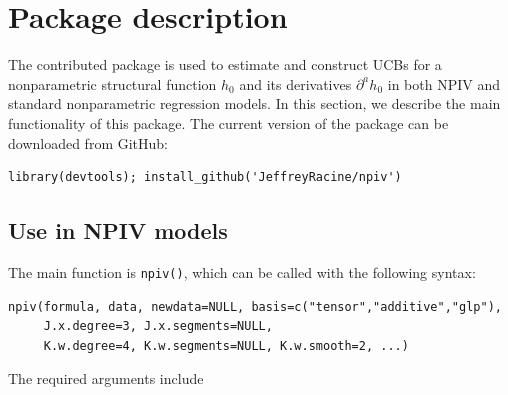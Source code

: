 \documentclass[
]{jss}
\begin{document}
\hypertarget{desc}{%
\section{Package description}\label{desc}}

The contributed  package  is used to estimate and
construct UCBs for a nonparametric structural function \(h_0\) and its
derivatives \(\partial^a h_0\) in both NPIV and standard nonparametric
regression models. In this section, we describe the main functionality
of this package. The current version of the package can be downloaded
from GitHub:

\begin{verbatim}
library(devtools); install_github('JeffreyRacine/npiv')
\end{verbatim}

\hypertarget{use-in-npiv-models}{%
\subsection{Use in NPIV models}\label{use-in-npiv-models}}

The main function is \texttt{npiv()}, which can be called with the
following syntax:

\begin{verbatim}
npiv(formula, data, newdata=NULL, basis=c("tensor","additive","glp"),
     J.x.degree=3, J.x.segments=NULL, 
     K.w.degree=4, K.w.segments=NULL, K.w.smooth=2, ...)
\end{verbatim}

The required arguments include
\end{document}

